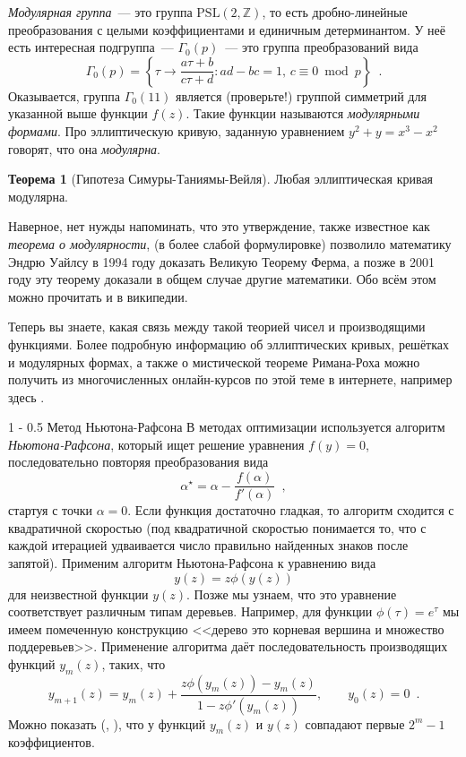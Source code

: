 \documentclass{article}
\makeatletter
\theoremstyle{definition}
\newtheorem*{theorem}{Теорема}
\renewcommand{\subsection}{\@startsection
{subsection}%
{1}%
{\z@}%
{-\baselineskip}%
{0.5\baselineskip}%
{\centering\large\scshape}} %
\makeatother
\begin{document}
\textit{Модулярная группа}~--- это группа \( \mathrm{PSL}(2, \mathbb Z) \), то есть дробно-линейные преобразования с целыми коэффициентами и единичным детерминантом. У неё есть интересная подгруппа~--- \( \Gamma_0(p) \)~--- это группа преобразований вида
\[
	\Gamma_0(p) = \left\{
		\tau \to \dfrac{a\tau + b}{c\tau + d} \colon ad - bc = 1, \, c \equiv 0 \bmod p
	\right\} \enspace .
\]
Оказывается, группа \( \Gamma_0(11) \) является (проверьте!) группой симметрий для указанной выше функции \( f(z) \). Такие функции называются \textit{модулярными формами}. Про эллиптическую кривую, заданную уравнением \( {y^2 + y = x^3 - x^2} \) говорят, что она \textit{модулярна}.

\begin{theorem}[Гипотеза Симуры-Таниямы-Вейля]
Любая эллиптическая кривая модулярна.
\end{theorem}
Наверное, нет нужды напоминать, что это утверждение, также известное как \textit{теорема о модулярности}, (в более слабой формулировке) позволило математику Эндрю Уайлсу в 1994 году доказать Великую Теорему Ферма, а позже в 2001 году эту теорему доказали в общем случае другие математики. Обо всём этом можно прочитать и в википедии.

Теперь вы знаете, какая связь между такой теорией чисел и производящими функциями. Более подробную информацию об эллиптических кривых, решётках и модулярных формах, а также о мистической теореме Римана-Роха можно получить из многочисленных онлайн-курсов по этой теме в интернете, например здесь \cite{MF}.

\subsection{Метод Ньютона-Рафсона}
В методах оптимизации используется алгоритм \textit{Ньютона-Рафсона}, который 
ищет решение уравнения \( f(y) = 0 \), последовательно повторяя преобразования 
вида
\[
	\alpha^{\star} = \alpha - \dfrac{f(\alpha)}{f'(\alpha)} \enspace,
\]
стартуя с точки \( \alpha = 0 \). Если функция достаточно гладкая, то алгоритм 
сходится с квадратичной скоростью (под квадратичной скоростью понимается то, что с каждой итерацией удваивается число правильно найденных знаков после запятой). Применим алгоритм Ньютона-Рафсона к 
уравнению вида
\[
	y(z) = z \phi(y(z))
\]
для неизвестной функции \( y(z) \). Позже мы узнаем, что это уравнение 
соответствует различным типам деревьев. Например, для функции \( \phi(\tau) = 
e^{\tau} \) мы имеем помеченную конструкцию <<дерево это корневая вершина и 
множество поддеревьев>>. Применение алгоритма даёт последовательность 
производящих функций \(  y_{m}(z) \), таких, что
\[
	y_{m+1}(z) = y_{m}(z) + \dfrac{z \phi(y_{m}(z)) - y_{m}(z)}{1 - z 
	\phi'(y_m(z))}, \qquad y_0(z) = 0 \enspace .
\]
Можно показать (\cite[I.64, p.88]{ac}, \cite[Section 3.3]{species}), что у функций \( y_{m}(z) \) и \( y(z) 
\) совпадают первые \( 2^m - 1 \) коэффициентов.
\end{document}
